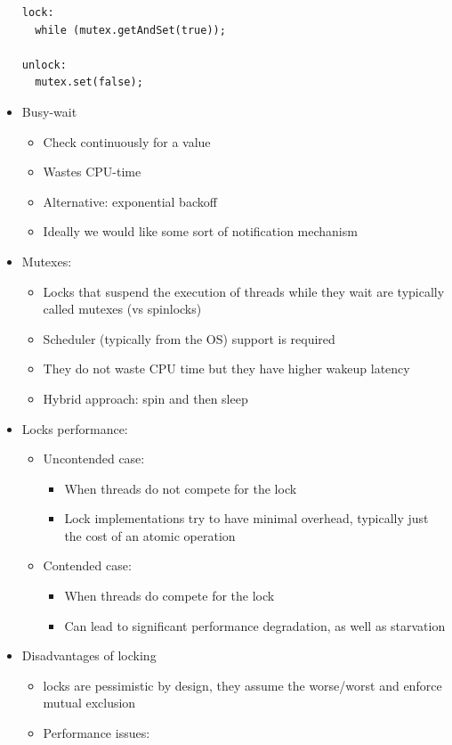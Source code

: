\documentclass[a4paper]{article}
\begin{document}
\begin{itemize}
\begin{lstlisting}
lock:
  while (mutex.getAndSet(true));

unlock:
  mutex.set(false);
\end{lstlisting}
\item Busy-wait
\begin{itemize}
\item Check continuously for a value
\item Wastes CPU-time 
\item Alternative: exponential backoff
\item Ideally we would like some sort of notification mechanism
\end{itemize}
\item Mutexes: 
\begin{itemize}
\item Locks that suspend the execution of threads while they wait are typically called mutexes (vs spinlocks)
\item Scheduler (typically from the OS) support is required
\item They do not waste CPU time but they have higher wakeup latency
\item Hybrid approach: spin and then sleep
\end{itemize}
\item Locks performance: 
\begin{itemize}
\item Uncontended case: 
\begin{itemize}
\item When threads do not compete for the lock
\item Lock implementations try to have minimal overhead, typically just the cost of an atomic operation
\end{itemize}
\item Contended case: 
\begin{itemize}
\item When threads do compete for the lock
\item Can lead to significant performance degradation, as well as starvation
\end{itemize}
\end{itemize}
\item Disadvantages of locking
\begin{itemize}
\item locks are pessimistic by design, they assume the worse/worst and enforce mutual exclusion
\item Performance issues: 
\begin{itemize}

\end{itemize}
\end{itemize}
\end{itemize}
\end{document}
